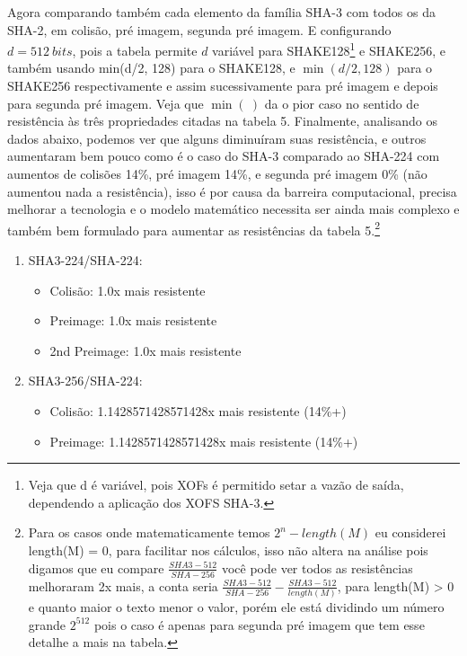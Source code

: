 \documentclass[12pt, a4paper]{article}
\begin{document}
\begin{enumerate}
\begin{enumerate}
Agora comparando também cada elemento da família SHA-3 com todos os da SHA-2, em
colisão, pré imagem, segunda pré imagem. E configurando $d = 512\ bits$, pois a
tabela permite $d$ variável para SHAKE128\footnote{Veja que d é variável, pois
XOFs é permitido setar a vazão de saída, dependendo a aplicação dos XOFS SHA-3.}
e SHAKE256, e também usando min(d/2, 128) para o SHAKE128, e $\min(d/2, 128)$
para o SHAKE256 respectivamente e assim sucessivamente para pré imagem e depois
para segunda pré imagem. Veja que $\min(~)$ da o pior caso no sentido de
resistência às três propriedades citadas na tabela 5. Finalmente, analisando os
dados abaixo, podemos ver que alguns diminuíram suas resistência, e outros
aumentaram bem pouco como é o caso do SHA-3 comparado ao SHA-224 com aumentos de
colisões 14\%, pré imagem 14\%, e segunda pré imagem 0\% (não aumentou nada a
resistência), isso é por causa da barreira computacional, precisa melhorar a
tecnologia e o modelo matemático necessita ser ainda mais complexo e também bem
formulado para aumentar as resistências da tabela 5.\footnote{Para os casos onde
matematicamente temos $2^{n} - length(M)$ eu considerei length(M) = 0, para
facilitar nos cálculos, isso não altera na análise pois digamos que eu compare
$\frac{SHA3-512}{SHA-256}$ você pode ver todos as resistências melhoraram 2x
mais, a conta seria $\frac{SHA3-512}{SHA-256} - \frac{SHA3-512}{length(M)}$,
para length(M) > 0 e quanto maior o texto menor o valor, porém ele está
dividindo um número grande $2^{512}$ pois o caso é apenas para segunda pré
imagem que tem esse detalhe a mais na tabela.} \\

\begin{enumerate}
\item SHA3-224/SHA-224:
 \begin{itemize}
 \item Colisão: 1.0x mais resistente

 \item Preimage: 1.0x mais resistente

 \item 2nd Preimage: 1.0x mais resistente
 \end{itemize}
\item SHA3-256/SHA-224:
 \begin{itemize}
 \item Colisão: 1.1428571428571428x mais resistente (14\%+)

 \item Preimage: 1.1428571428571428x mais resistente (14\%+)


\end{itemize}
\end{enumerate}
\end{enumerate}
\end{enumerate}
\end{document}
